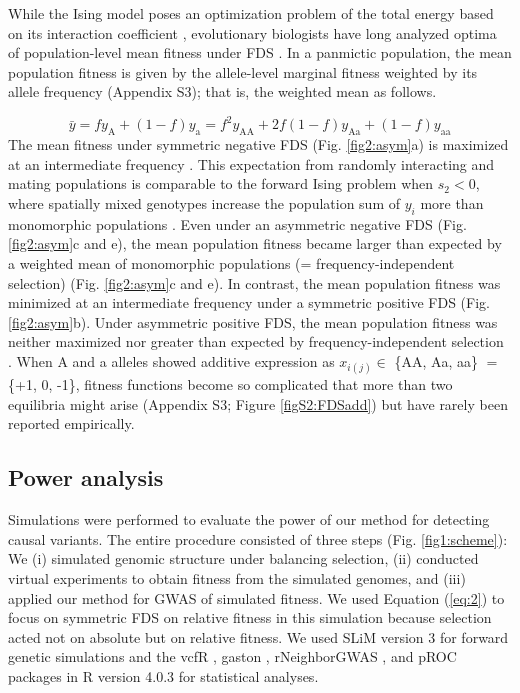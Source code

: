 \documentclass[12pt,]{article}
\begin{document}
While the Ising model poses an optimization problem of the total energy based on its interaction coefficient \citep{cipra1987introduction, anderson1991two, prugel1997dynamics}, evolutionary biologists have long analyzed optima of population-level mean fitness under FDS \citep{cockerham1972frequency,schneider_maximization_2008,takahashi2018balanced}. In a panmictic population, the mean population fitness is given by the allele-level marginal fitness weighted by its allele frequency (Appendix S3); that is, the weighted mean as follows.

\begin{equation}
\bar{y} = f y_\mathrm{A} + (1-f)y_\mathrm{a} = f^2 y_\mathrm{AA} + 2f (1-f)y_\mathrm{Aa} + (1-f)y_\mathrm{aa} \label{eq:6}
\end{equation}
\noindent
The mean fitness under symmetric negative FDS (Fig. \ref{fig2:asym}a) is maximized at an intermediate frequency \citep{schneider_maximization_2008}. This expectation from randomly interacting and mating populations is comparable to the forward Ising problem when $s_2<0$, where spatially mixed genotypes increase the population sum of $y_i$ more than monomorphic populations \citep{sato2019neighbor}. Even under an asymmetric negative FDS (Fig. \ref{fig2:asym}c and e), the mean population fitness became larger than expected by a weighted mean of monomorphic populations (= frequency-independent selection) \citep{takahashi2018balanced} (Fig. \ref{fig2:asym}c and e). In contrast, the mean population fitness was minimized at an intermediate frequency under a symmetric positive FDS (Fig. \ref{fig2:asym}b). Under asymmetric positive FDS, the mean population fitness was neither maximized nor greater than expected by frequency-independent selection \citep{schneider_maximization_2008, takahashi2018balanced}. When A and a alleles showed additive expression as $x_{i(j)} \in$ \{AA, Aa, aa\} $=$ \{+1, 0, -1\}, fitness functions become so complicated that more than two equilibria might arise (Appendix S3; Figure \ref{figS2:FDSadd}) but have rarely been reported empirically. 

\subsection{Power analysis}
Simulations were performed to evaluate the power of our method for detecting causal variants. The entire procedure consisted of three steps (Fig. \ref{fig1:scheme}): We (i) simulated genomic structure under balancing selection, (ii) conducted virtual experiments to obtain fitness from the simulated genomes, and (iii) applied our method for GWAS of simulated fitness. We used Equation (\ref{eq:2}) to focus on symmetric FDS on relative fitness in this simulation because selection acted not on absolute but on relative fitness. We used SLiM version 3 \citep{haller_slim_2019} for forward genetic simulations and the vcfR \citep{knaus2017vcfr}, gaston \citep{R_gaston}, rNeighborGWAS \citep{sato2019neighbor}, and pROC \citep{R_pROC} packages in R version 4.0.3 \citep{R_citation} for statistical analyses.
\end{document}
